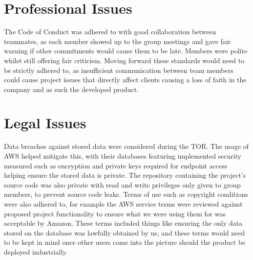 \documentclass[]{report}
\begin{document}

\section{Professional Issues}
The Code of Conduct was adhered to with good collaboration between teammates, as each member showed up to the group meetings and gave fair warning if other commitments would cause them to be late. Members were polite whilst still offering fair criticism. Moving forward these standards would need to be strictly adhered to, as insufficient communication between team members could cause project issues that directly affect clients causing a loss of faith in the company and as such the developed product.

\section{Legal Issues}
Data breaches against stored data were considered during the TOR. The usage of AWS helped mitigate this, with their databases featuring implemented security measured\cite{awsdatabasedocs} such as encryption and private keys required for endpoint access helping ensure the stored data is private. The repository containing the project's source code was also private with read and write privileges only given to group members, to prevent source code leaks. Terms of use such as copyright conditions were also adhered to, for example the AWS service terms\cite{awsserviceterms} were reviewed against proposed project functionality to ensure what we were using them for was acceptable by Amazon. These terms included things like ensuring the only data stored on the database was lawfully obtained by us, and these terms would need to be kept in mind once other users come into the picture should the product be deployed industrially. 
\end{document}
